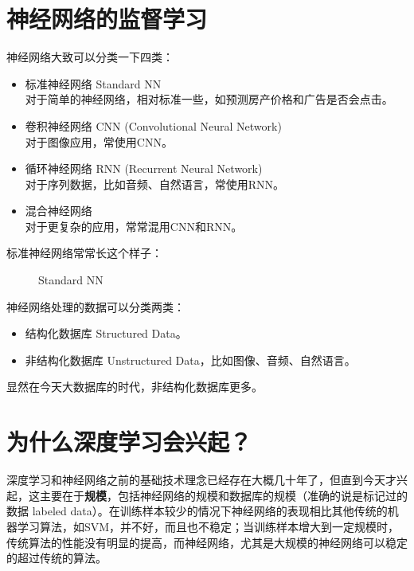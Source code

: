 \documentclass[../../main.tex]{subfiles}
\begin{document}
\section{神经网络的监督学习}
神经网络大致可以分类一下四类：
\begin{itemize}
    \item 标准神经网络 Standard NN\\对于简单的神经网络，相对标准一些，如预测房产价格和广告是否会点击。
    \item 卷积神经网络 CNN (Convolutional Neural Network)\\对于图像应用，常使用CNN。
    \item 循环神经网络 RNN (Recurrent Neural Network)\\对于序列数据，比如音频、自然语言，常使用RNN。
    \item 混合神经网络\\对于更复杂的应用，常常混用CNN和RNN。
\end{itemize}
标准神经网络常常长这个样子：
\begin{figure}[H]
    \centering
    \caption{Standard NN}
\end{figure}
神经网络处理的数据可以分类两类：
\begin{itemize}
    \item 结构化数据库 Structured Data。
    \item 非结构化数据库 Unstructured Data，比如图像、音频、自然语言。
\end{itemize}
显然在今天大数据库的时代，非结构化数据库更多。
\section{为什么深度学习会兴起？}
深度学习和神经网络之前的基础技术理念已经存在大概几十年了，但直到今天才兴起，这主要在于\textbf{规模}，包括神经网络的规模和数据库的规模（准确的说是标记过的数据 labeled data）。在训练样本较少的情况下神经网络的表现相比其他传统的机器学习算法，如SVM，并不好，而且也不稳定；当训练样本增大到一定规模时，传统算法的性能没有明显的提高，而神经网络，尤其是大规模的神经网络可以稳定的超过传统的算法。
\end{document}

